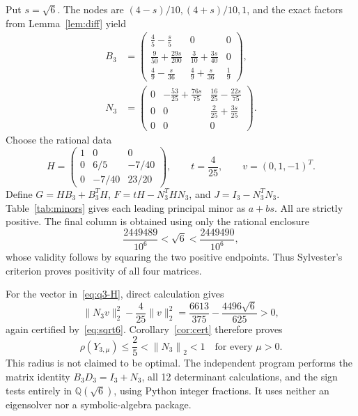 \documentclass[11pt,letterpaper]{article}
\theoremstyle{remark}
\newcommand{\Q}{\mathbb Q}
\newcommand{\Id}{I}
\newcommand{\norm}[1]{\left\|#1\right\|_2}
\newcommand{\code}[1]{\texttt{\detokenize{#1}}}
\begin{document}
Put \(s=\sqrt6\). The nodes are \((4-s)/10,(4+s)/10,1\), and the exact factors
from Lemma~\ref{lem:diff} yield
\begin{align*}
 B_3&=\begin{pmatrix}
 \frac45-\frac{s}{5}&0&0\\[3pt]
 \frac9{50}+\frac{29s}{200}&\frac3{10}+\frac{3s}{40}&0\\[3pt]
 \frac49-\frac{s}{36}&\frac49+\frac{s}{36}&\frac19
 \end{pmatrix},\\
 N_3&=\begin{pmatrix}
 0&-\frac{53}{25}+\frac{76s}{75}&\frac{16}{25}-\frac{22s}{75}\\[3pt]
 0&0&\frac2{25}+\frac{3s}{25}\\[3pt]
 0&0&0
 \end{pmatrix}.
\end{align*}
Choose the rational data
\begin{equation}\label{eq:q3-H}
 H=\begin{pmatrix}1&0&0\\0&6/5&-7/40\\0&-7/40&23/20\end{pmatrix},
 \qquad t=\frac4{25},\qquad v=(0,1,-1)^T.
\end{equation}
Define \(G=HB_3+B_3^TH\), \(F=tH-N_3^THN_3\), and
\(J=\Id_3-N_3^TN_3\). Table~\ref{tab:minors} gives each leading principal
minor as \(a+bs\). All are strictly positive. The final column is obtained
using only the rational enclosure
\begin{equation}\label{eq:sqrt6}
 \frac{2449489}{10^6}<\sqrt6<\frac{2449490}{10^6},
\end{equation}
whose validity follows by squaring the two positive endpoints.
Thus Sylvester's criterion proves positivity of all four matrices.

\begin{table}[htbp]
\centering
\small
\renewcommand{\arraystretch}{1.6}

\caption{Exact three-stage leading principal minors, written \(a+b\sqrt6\).
The displayed decimal lower bounds are rounded downward; every bound is positive.}
\label{tab:minors}
\end{table}

For the vector in~\eqref{eq:q3-H}, direct calculation gives
\begin{equation}\label{eq:q3gap}
 \|N_3v\|_2^2-\frac4{25}\|v\|_2^2
 =\frac{6613}{375}-\frac{4496\sqrt6}{625}>0,
\end{equation}
again certified by~\eqref{eq:sqrt6}. Corollary~\ref{cor:cert} therefore proves
\begin{equation}\label{eq:q3result}
 \boxed{\displaystyle
 \rho(Y_{3,\mu})\le\frac25<\norm{N_3}<1\quad\text{for every }\mu>0.}
\end{equation}
This radius is not claimed to be optimal. The independent program
\code{code/exact_q3.py} performs the matrix identity \(B_3D_3=\Id_3+N_3\),
all 12 determinant calculations, and the sign tests entirely in
\(\Q(\sqrt6)\), using Python integer fractions. It uses neither an eigensolver
nor a symbolic-algebra package.
\end{document}
